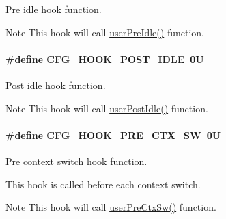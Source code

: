 Pre idle hook function. 

\begin{DoxyNote}{Note}
This hook will call \hyperlink{group__kern__hook_ga2bd40d82f768787c3dab2f4df336685e}{user\-Pre\-Idle()} function. 
\end{DoxyNote}
\hypertarget{group__template__kern__cfg_ga8f8751efe94964bef25673deca6b9b26}{
\paragraph[{C\-F\-G\-\_\-\-H\-O\-O\-K\-\_\-\-P\-O\-S\-T\-\_\-\-I\-D\-L\-E}]{\setlength{\rightskip}{0pt plus 5cm}\#define C\-F\-G\-\_\-\-H\-O\-O\-K\-\_\-\-P\-O\-S\-T\-\_\-\-I\-D\-L\-E~0\-U}}\label{group__template__kern__cfg_ga8f8751efe94964bef25673deca6b9b26}


Post idle hook function. 

\begin{DoxyNote}{Note}
This hook will call \hyperlink{group__kern__hook_ga7ca4a96cbe5064d633298d1d172fd4e7}{user\-Post\-Idle()} function. 
\end{DoxyNote}
\hypertarget{group__template__kern__cfg_gac84acbf84222018398089920dd429635}{
\paragraph[{C\-F\-G\-\_\-\-H\-O\-O\-K\-\_\-\-P\-R\-E\-\_\-\-C\-T\-X\-\_\-\-S\-W}]{\setlength{\rightskip}{0pt plus 5cm}\#define C\-F\-G\-\_\-\-H\-O\-O\-K\-\_\-\-P\-R\-E\-\_\-\-C\-T\-X\-\_\-\-S\-W~0\-U}}\label{group__template__kern__cfg_gac84acbf84222018398089920dd429635}


Pre context switch hook function. 

This hook is called before each context switch. \begin{DoxyNote}{Note}
This hook will call \hyperlink{group__kern__hook_ga74a38c965110d0f2f2e44e13571fe3fc}{user\-Pre\-Ctx\-Sw()} function. 
\end{DoxyNote}

